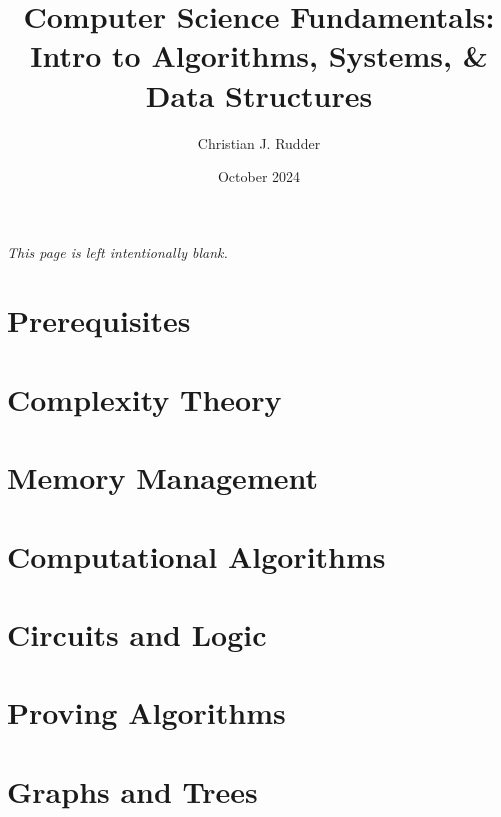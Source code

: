 \documentclass{memoir}
\title{\textbf{Computer Science Fundamentals:}\\
\Large{Intro to Algorithms, Systems, \& Data Structures}}
\author{Christian J. Rudder}
\date{October 2024}
\begin{document}
\maketitle
\setcounter{secnumdepth}{2}
\setcounter{tocdepth}{3}

\tableofcontents

\newpage
\thispagestyle{empty}
\mbox{}
\vfill
\begin{center}
    \textit{This  page is left intentionally blank.}
\end{center}
\vfill
\newpage



\chapter*{Prerequisites}


\chapter{Complexity Theory}


\chapter{Memory Management}





\chapter{Computational Algorithms}






\chapter{Circuits and Logic}



\chapter{Proving Algorithms}


\chapter{Graphs and Trees}




\end{document}

